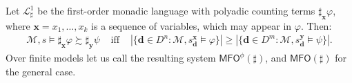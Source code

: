 \documentclass[12pt,oneside,reqno]{amsart}
\theoremstyle{definition}
\begin{document}
Let $\mathcal{L}^1_{\sharp}$ be the first-order monadic language with polyadic counting terms $\sharp_{\mathbf{x}}\varphi$, where $\mathbf{x} = x_1,\dots,x_k$ is a sequence of variables, which may appear in $\varphi$.  Then: \vspace{0.5ex}\begin{eqnarray*} \mathcal{M},s \vDash \sharp_{\mathbf{x}}\varphi \succsim \sharp_{\mathbf{y}}\psi & \mbox{ iff }  & |\{\mathbf{d} \in D^n: \mathcal{M},s^{\mathbf{x}}_{\mathbf{d}} \models \varphi\}| \geq |\{\mathbf{d} \in D^m: \mathcal{M},s^{\mathbf{y}}_{\mathbf{d}} \models \psi\}|. \end{eqnarray*} \vspace{0.5ex} Over finite models let us call the resulting system $\mathsf{MFO}^{\phi}(\sharp)$, and $\mathsf{MFO}(\sharp)$ for the general case.
\end{document}
